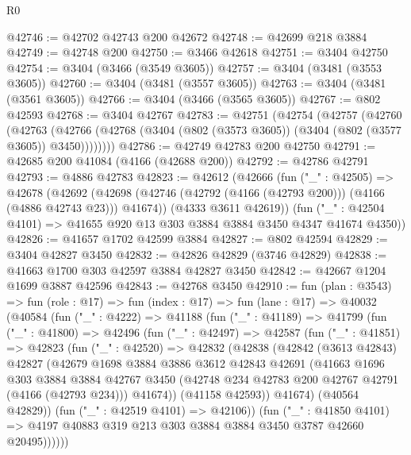 \begin{lexlean}{R0}
\begin{coremodule}
@42746 := @42702 @42743 @200 @42672
@42748 := @42699 @218 @3884
@42749 := @42748 @200
@42750 := @3466 @42618
@42751 := @3404 @42750
@42754 := @3404 (@3466 (@3549 @3605))
@42757 := @3404 (@3481 (@3553 @3605))
@42760 := @3404 (@3481 (@3557 @3605))
@42763 := @3404 (@3481 (@3561 @3605))
@42766 := @3404 (@3466 (@3565 @3605))
@42767 := @802 @42593
@42768 := @3404 @42767
@42783 := @42751
    (@42754
      (@42757
        (@42760
          (@42763
            (@42766 (@42768 (@3404 (@802 (@3573 @3605)) (@3404 (@802 (@3577 @3605)) @3450))))))))
@42786 := @42749 @42783 @200 @42750
@42791 := @42685 @200 @41084 (@4166 (@42688 @200))
@42792 := @42786 @42791
@42793 := @4886 @42783
@42823 := @42612
    (@42666
      (fun ("_" : @42505) =>
      @42678
        (@42692 (@42698 (@42746 (@42792 (@4166 (@42793 @200))) (@4166 (@4886 @42743 @23))) @41674))
        (@4333 @3611 @42619))
      (fun ("_" : @42504 @4101) => @41655 @920 @13 @303 @3884 @3884 @3450 @4347 @41674 @4350))
@42826 := @41657 @1702 @42599 @3884
@42827 := @802 @42594
@42829 := @3404 @42827 @3450
@42832 := @42826 @42829 (@3746 @42829)
@42838 := @41663 @1700 @303 @42597 @3884 @42827 @3450
@42842 := @42667 @1204 @1699 @3887 @42596
@42843 := @42768 @3450
@42910 := fun (plan : @3543) =>
  fun (role : @17) =>
  fun (index : @17) =>
  fun (lane : @17) =>
  @40032
    (@40584
      (fun ("_" : @4222) =>
      @41188
        (fun ("_" : @41189) =>
        @41799
          (fun ("_" : @41800) =>
          @42496
            (fun ("_" : @42497) =>
            @42587
              (fun ("_" : @41851) =>
              @42823
                (fun ("_" : @42520) =>
                @42832
                  (@42838
                    (@42842
                      (@3613 @42843)
                      @42827
                      (@42679
                        @1698
                        @3884
                        @3886
                        @3612
                        @42843
                        @42691
                        (@41663
                          @1696
                          @303
                          @3884
                          @3884
                          @42767
                          @3450
                          (@42748 @234 @42783 @200 @42767 @42791 (@4166 (@42793 @234)))
                          @41674))
                      (@41158 @42593))
                    @41674)
                  (@40564 @42829))
                (fun ("_" : @42519 @4101) => @42106))
              (fun ("_" : @41850 @4101) =>
              @4197 @40883 @319 @213 @303 @3884 @3884 @3450 @3787 @42660 @20495))))))

\end{coremodule}
\end{lexlean}
